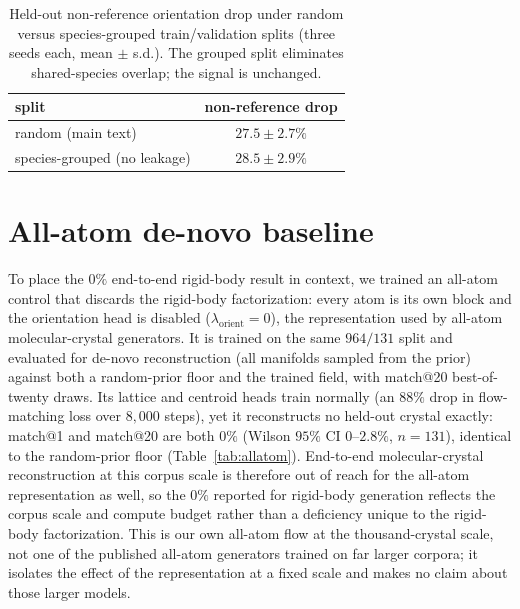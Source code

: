 \documentclass[11pt]{article}
\begin{document}
\begin{table}[h]
\centering
\caption{Held-out non-reference orientation drop under random versus
species-grouped train/validation splits (three seeds each, mean $\pm$ s.d.). The
grouped split eliminates shared-species overlap; the signal is unchanged.}
\label{tab:grouped}
\begin{tabular}{lc}
\toprule
split & non-reference drop \\
\midrule
random (main text)        & $27.5\pm2.7\%$ \\
species-grouped (no leakage) & $28.5\pm2.9\%$ \\
\bottomrule
\end{tabular}
\end{table}

\section{All-atom de-novo baseline}

To place the $0\%$ end-to-end rigid-body result in context, we trained an
all-atom control that discards the rigid-body factorization: every atom is its own
block and the orientation head is disabled ($\lambda_{\text{orient}}=0$), the
representation used by all-atom molecular-crystal
generators\cite{jin2025oxtal,subramanian2026packflow}. It is trained on the same
$964/131$ split and evaluated for de-novo reconstruction (all manifolds sampled
from the prior) against both a random-prior floor and the trained field, with
match@20 best-of-twenty draws. Its lattice and centroid heads train normally (an
$88\%$ drop in flow-matching loss over $8{,}000$ steps), yet it reconstructs no
held-out crystal exactly: match@1 and match@20 are both $0\%$ (Wilson $95\%$ CI
$0$--$2.8\%$, $n=131$), identical to the random-prior floor
(Table~\ref{tab:allatom}). End-to-end molecular-crystal reconstruction at this
corpus scale is therefore out of reach for the all-atom representation as well, so
the $0\%$ reported for rigid-body generation reflects the corpus scale and compute
budget rather than a deficiency unique to the rigid-body factorization. This is
our own all-atom flow at the thousand-crystal scale, not one of the published
all-atom generators\cite{jin2025oxtal,subramanian2026packflow} trained on far
larger corpora; it isolates the effect of the representation at a fixed scale and
makes no claim about those larger models.
\end{document}
